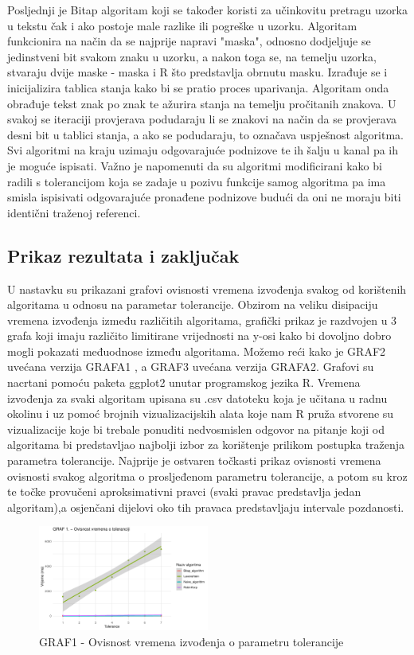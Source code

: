 \documentclass[conference]{IEEEtran}
\begin{document}
Posljednji je Bitap algoritam koji se također koristi za učinkovitu pretragu uzorka u tekstu čak i ako postoje male razlike ili pogreške u uzorku. Algoritam funkcionira na način da se  najprije napravi "maska", odnosno dodjeljuje se jedinstveni bit svakom znaku u uzorku, a nakon toga se, na temelju uzorka, stvaraju dvije maske - maska i R što predstavlja obrnutu masku. Izrađuje se i inicijalizira tablica stanja kako bi se pratio proces uparivanja. Algoritam onda obrađuje tekst znak po znak te ažurira stanja na temelju pročitanih znakova. U svakoj se iteraciji provjerava podudaraju li se znakovi na način da se provjerava desni bit u tablici stanja, a ako se podudaraju, to označava uspješnost algoritma.\\
Svi algoritmi na kraju uzimaju odgovarajuće podnizove te ih šalju u kanal pa ih je moguće ispisati. Važno je napomenuti da su algoritmi modificirani kako bi radili s tolerancijom koja se zadaje u pozivu funkcije samog algoritma pa ima smisla ispisivati odgovarajuće pronađene podnizove budući da oni ne moraju biti identični traženoj referenci.

\subsection{Prikaz rezultata i zaključak}
U nastavku su prikazani grafovi ovisnosti vremena izvođenja svakog od korištenih algoritama u odnosu na parametar tolerancije. Obzirom na veliku disipaciju vremena izvođenja između različitih algoritama, grafički prikaz je razdvojen u 3 grafa koji imaju različito limitirane vrijednosti na y-osi kako bi dovoljno dobro mogli pokazati međuodnose između algoritama. Možemo reći kako je GRAF2 uvećana verzija GRAFA1 , a GRAF3 uvećana verzija GRAFA2.
Grafovi su nacrtani pomoću paketa ggplot2 unutar programskog jezika R. Vremena izvođenja za svaki algoritam upisana su .csv datoteku koja je učitana u radnu okolinu i uz pomoć brojnih vizualizacijskih alata koje nam R pruža stvorene su vizualizacije koje bi trebale ponuditi nedvosmislen odgovor na pitanje koji od algoritama bi predstavljao najbolji izbor za korištenje prilikom postupka traženja parametra tolerancije. Najprije je ostvaren točkasti prikaz ovisnosti vremena ovisnosti svakog algoritma o prosljeđenom parametru tolerancije, a potom su kroz te točke provučeni aproksimativni pravci (svaki pravac predstavlja jedan algoritam),a osjenčani dijelovi oko tih pravaca predstavljaju intervale pozdanosti.

\begin{figure}[htbp]
\centerline{\includegraphics[width=0.5\textwidth]{Grafovi_i_csv_datoteke/GRAF1.png}}
\caption{GRAF1 - Ovisnost vremena izvođenja o parametru tolerancije}
\label{fig}
\end{figure}
\end{document}
